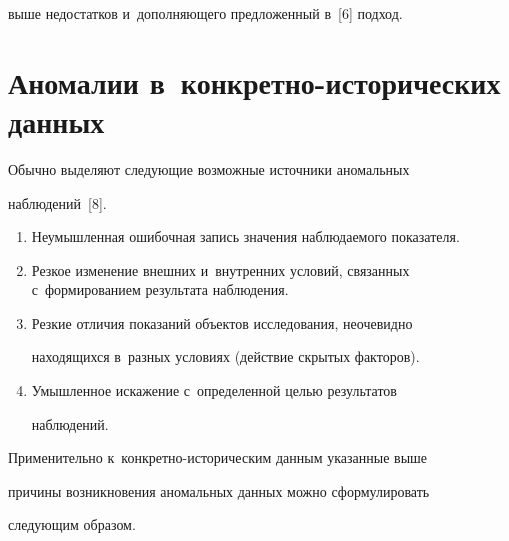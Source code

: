 выше недостатков и~дополняющего предложенный в~[6] подход.


  





  


\section{Аномалии в~конкретно-исторических данных}





  Обычно выделяют следующие возможные источники аномальных 


наблюдений~[8].


  \begin{enumerate}[1.]


  \item Неумышленная ошибочная запись значения наблюдаемого показателя.


  \item Резкое изменение внешних и~внутренних условий, связанных с~формированием результата наблюдения.


  \item Резкие отличия показаний объектов исследования, неочевидно 


находящихся в~разных условиях (действие скрытых факторов).


  \item Умышленное искажение с~определенной целью результатов 


наблюдений.


  \end{enumerate}


  


  Применительно к~конкретно-историческим данным указанные выше 


причины возникновения аномальных данных можно сформулировать 


следующим образом.


